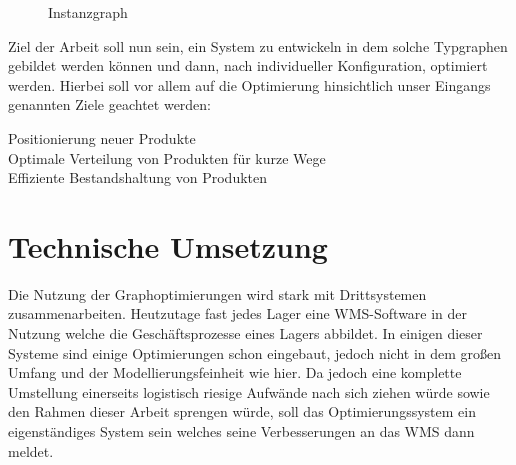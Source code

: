 \begin{figure}[!htbp]
    \begin{center}
        \caption{Instanzgraph}
    \end{center}
    \label{fig:figure}
\end{figure}

Ziel der Arbeit soll nun sein, ein System zu entwickeln in dem solche Typgraphen gebildet werden können und dann, nach
individueller Konfiguration, optimiert werden.
Hierbei soll vor allem auf die Optimierung hinsichtlich unser Eingangs genannten Ziele geachtet werden:
\begin{description}
    \item[Positionierung neuer Produkte]
    \item[Optimale Verteilung von Produkten für kurze Wege]
    \item[Effiziente Bestandshaltung von Produkten]
\end{description}

\section{Technische Umsetzung}
Die Nutzung der Graphoptimierungen wird stark mit Drittsystemen zusammenarbeiten. Heutzutage fast jedes Lager eine
WMS-Software in der Nutzung welche die Geschäftsprozesse eines Lagers abbildet. In einigen dieser Systeme sind einige Optimierungen
schon eingebaut, jedoch nicht in dem großen Umfang und der Modellierungsfeinheit wie hier. Da jedoch eine komplette Umstellung
einerseits logistisch riesige Aufwände nach sich ziehen würde sowie den Rahmen dieser Arbeit sprengen würde, soll das Optimierungssystem
ein eigenständiges System sein welches seine Verbesserungen an das WMS dann meldet.




















